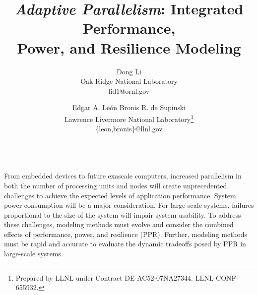 \documentclass{article}  %
\begin{document}
\title{\emph{Adaptive Parallelism}: Integrated Performance, \\Power,
  and Resilience Modeling}

\author{Dong Li\\Oak Ridge National Laboratory\\lid1@ornl.gov
  \and Edgar A. Le{\'o}n \hspace{6mm} Bronis R. de Supinski\\
Lawrence Livermore National Laboratory\thanks{Prepared by LLNL under Contract
    DE-AC52-07NA27344. LLNL-CONF-655932.}\\\{leon,bronis\}@llnl.gov} 


\date{}

\maketitle

\\
From embedded devices to future exascale computers, increased
parallelism in both the number of processing units and nodes will
create unprecedented challenges to achieve the expected levels of
application performance. System power consumption will be a major 
consideration. For large-scale systems, failures proportional
to the size of the system will impair system usability. To address 
these challenges, modeling methods must evolve and consider the 
combined effects of performance, power, and resilience (PPR). 
Further, modeling methods must be rapid and accurate to evaluate 
the dynamic tradeoffs posed by PPR in large-scale systems. 

\end{document}

